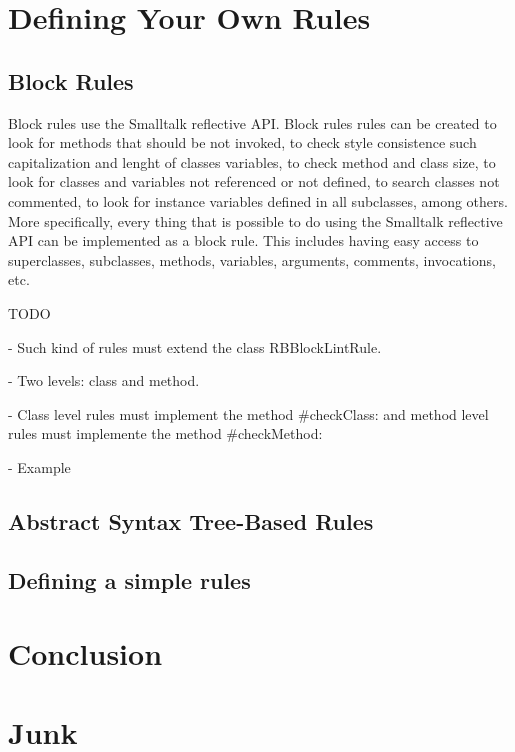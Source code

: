 \documentclass[a4paper,10pt,twoside]{book}
\begin{document}
\section{Defining Your Own Rules}

\subsection{Block Rules}




Block rules use the Smalltalk reflective API. Block rules rules can be created to look for methods that should be not invoked, to check style consistence such capitalization and lenght of classes variables, to check method and class size, to look for classes and variables not referenced or not defined, to search classes not commented, to look for instance variables defined in all subclasses, among others. More specifically, every thing that is possible to do using the Smalltalk reflective API can be implemented as a block rule. This includes having easy access to superclasses, subclasses, methods, variables, arguments, comments, invocations, etc.

TODO

- Such kind of rules must extend the class RBBlockLintRule.

- Two levels: class and method.

- Class level rules must implement the method \#checkClass: and method level rules must implemente the method \#checkMethod:

- Example

\subsection{Abstract Syntax Tree-Based Rules}

\subsection{Defining a simple rules}

\section{Conclusion}







\section{Junk}
\end{document}
